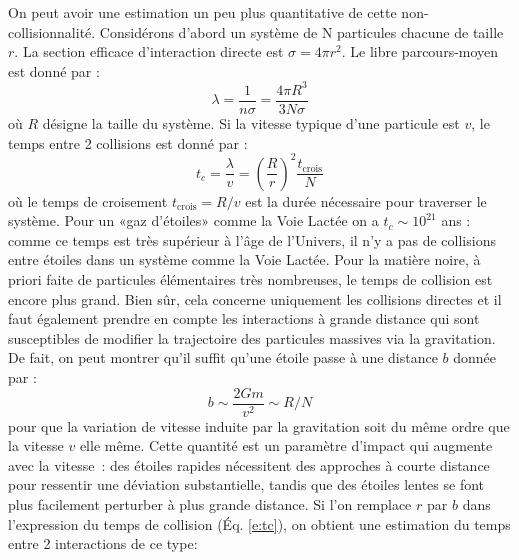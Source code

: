 On peut avoir une estimation un peu plus quantitative de cette non-collisionnalité. Considérons d'abord un système de N particules chacune de taille $r$. La section efficace d'interaction directe est $\sigma=4\pi r^2$. Le libre parcours-moyen est donné par :
\begin{equation}
\lambda=\frac{1}{n\sigma}=\frac{4\pi R^3}{3 N \sigma}
\end{equation}
où $R$ désigne la taille du système. Si la vitesse typique d'une particule est $v$, le temps entre 2 collisions est donné par :
\begin{equation}
t_c=\frac{\lambda}{v}=\left(\frac{R}{r}\right)^2 \frac{t_\mathrm{crois}}{N}
\label{e:tc}
\end{equation}
où le temps de croisement $t_\mathrm{crois}=R/v$ est la durée nécessaire pour traverser le système. Pour un «gaz d'étoiles» comme la Voie Lactée on a $t_c\sim 10^{21}$ ans : comme ce temps est très supérieur à l'âge de l'Univers, il n'y a pas de collisions entre étoiles dans un système comme la Voie Lactée. Pour la matière noire, à priori faite de particules élémentaires très nombreuses, le temps de collision est encore plus grand.
Bien sûr, cela concerne uniquement les collisions directes et il faut également prendre en compte les interactions à grande distance qui sont susceptibles de modifier la trajectoire des particules massives via la gravitation. De fait, on peut montrer qu'il suffit qu'une étoile passe à une distance $b$ donnée par :
\begin{equation}
b\sim\frac{2Gm}{v^2}\sim R/N
\end{equation}
pour que la variation de vitesse induite par la gravitation soit du même ordre que la vitesse $v$ elle même. Cette quantité est un paramètre d'impact qui augmente avec la vitesse~: des étoiles rapides nécessitent des approches à courte distance pour ressentir une déviation substantielle, tandis que des étoiles lentes se font plus facilement perturber à plus grande distance. Si l'on remplace $r$ par $b$ dans l'expression du temps de collision (Éq. \ref{e:tc}), on obtient une estimation du temps entre 2 interactions de ce type:
